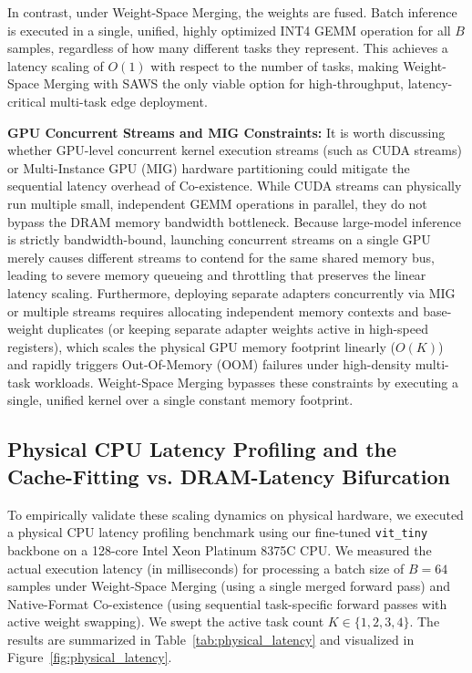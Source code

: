 \documentclass{article}
\theoremstyle{plain}
\theoremstyle{definition}
\theoremstyle{remark}
\begin{document}
In contrast, under Weight-Space Merging, the weights are fused. Batch inference is executed in a single, unified, highly optimized INT4 GEMM operation for all $B$ samples, regardless of how many different tasks they represent. This achieves a latency scaling of $O(1)$ with respect to the number of tasks, making Weight-Space Merging with SAWS the only viable option for high-throughput, latency-critical multi-task edge deployment.

\textbf{GPU Concurrent Streams and MIG Constraints:} It is worth discussing whether GPU-level concurrent kernel execution streams (such as CUDA streams) or Multi-Instance GPU (MIG) hardware partitioning could mitigate the sequential latency overhead of Co-existence. While CUDA streams can physically run multiple small, independent GEMM operations in parallel, they do not bypass the DRAM memory bandwidth bottleneck. Because large-model inference is strictly bandwidth-bound, launching concurrent streams on a single GPU merely causes different streams to contend for the same shared memory bus, leading to severe memory queueing and throttling that preserves the linear latency scaling. Furthermore, deploying separate adapters concurrently via MIG or multiple streams requires allocating independent memory contexts and base-weight duplicates (or keeping separate adapter weights active in high-speed registers), which scales the physical GPU memory footprint linearly ($O(K)$) and rapidly triggers Out-Of-Memory (OOM) failures under high-density multi-task workloads. Weight-Space Merging bypasses these constraints by executing a single, unified kernel over a single constant memory footprint.

\subsection{Physical CPU Latency Profiling and the Cache-Fitting vs. DRAM-Latency Bifurcation}
\label{app:physical_profiling}
To empirically validate these scaling dynamics on physical hardware, we executed a physical CPU latency profiling benchmark using our fine-tuned \texttt{vit\_tiny} backbone on a 128-core Intel Xeon Platinum 8375C CPU. We measured the actual execution latency (in milliseconds) for processing a batch size of $B=64$ samples under Weight-Space Merging (using a single merged forward pass) and Native-Format Co-existence (using sequential task-specific forward passes with active weight swapping). We swept the active task count $K \in \{1, 2, 3, 4\}$. The results are summarized in Table~\ref{tab:physical_latency} and visualized in Figure~\ref{fig:physical_latency}.
\end{document}

